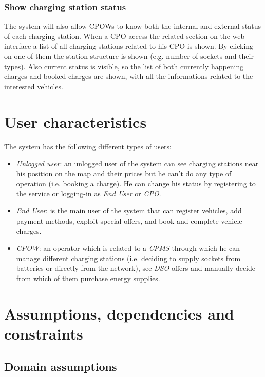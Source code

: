 \documentclass[a4paper]{report}
\begin{document}
\subsubsection{Show charging station status}
The system will also allow CPOWs to know both the internal and external status of each charging station. When a CPO access the related section on the web interface a list of all charging stations related to his CPO is shown. By clicking on one of them the station structure is shown (e.g. number of sockets and their types). Also current status is visible, so the list of both currently happening charges and booked charges are shown, with all the informations related to the interested vehicles.


\section{User characteristics}
The system has the following different types of users:
\begin{itemize}
\item \textit{Unlogged user}: an unlogged user of the system can see charging stations near his position on the map and their prices but he can't do any type of operation (i.e. booking a charge). He can change his status by registering to the service or logging-in as \textit{End User} or \textit{CPO}.
\item \textit{End User}: is the main user of the system that can register vehicles, add payment methods, exploit special offers, and book and complete vehicle charges.
\item \textit{CPOW}: an operator which is related to a \textit{CPMS} through which he can manage different charging stations (i.e. deciding to supply sockets from batteries or directly from the network), see \textit{DSO} offers and manually decide from which of them purchase energy supplies.

\end{itemize}


\section{Assumptions, dependencies and constraints}

\subsection{Domain assumptions}
\end{document}
